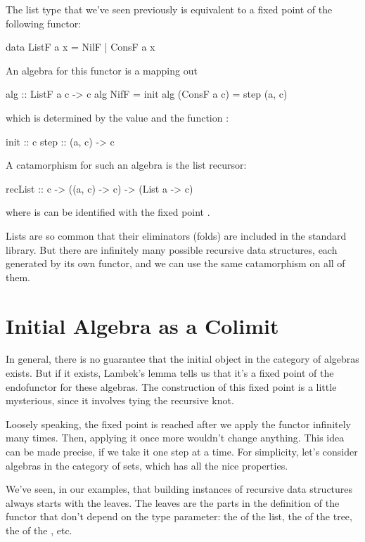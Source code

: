 \documentclass[DaoFP]{subfiles}
\begin{document}
The list type that we've seen previously is equivalent to a fixed point of the following functor:
\begin{haskell}
data ListF a x = NilF | ConsF a x
\end{haskell}
An algebra for this functor is a mapping out 
\begin{haskell}
alg :: ListF a c -> c
alg NifF = init
alg (ConsF a c) = step (a, c)
\end{haskell}
which is determined by the value  and the function :
\begin{haskell}
init :: c
step :: (a, c) -> c
\end{haskell}
A catamorphism for such an algebra is the list recursor:
\begin{haskell}
recList :: c -> ((a, c) -> c) -> (List a -> c)
\end{haskell}
where  is can be identified with the fixed point .

Lists are so common that their eliminators (folds) are included in the standard library. But there are infinitely many possible recursive data structures, each generated by its own functor, and we can use the same catamorphism on all of them.

\section{Initial Algebra as a Colimit}

In general, there is no guarantee that the initial object in the category of algebras exists. But if it exists, Lambek's lemma tells us that it's a fixed point of the endofunctor for these algebras.  The construction of this fixed point is a little mysterious, since it involves tying the recursive knot. 

Loosely speaking, the fixed point is reached after we apply the functor infinitely many times. Then, applying it once more wouldn't change anything. This idea can be made precise, if we take it one step at a time. For simplicity, let's consider algebras in the category of sets, which has all the nice properties.

We've seen, in our examples, that building instances of recursive data structures always starts with the leaves. The leaves are the parts in the definition of the functor that don't depend on the type parameter: the  of the list, the  of the tree, the  of the , etc. 
\end{document}
